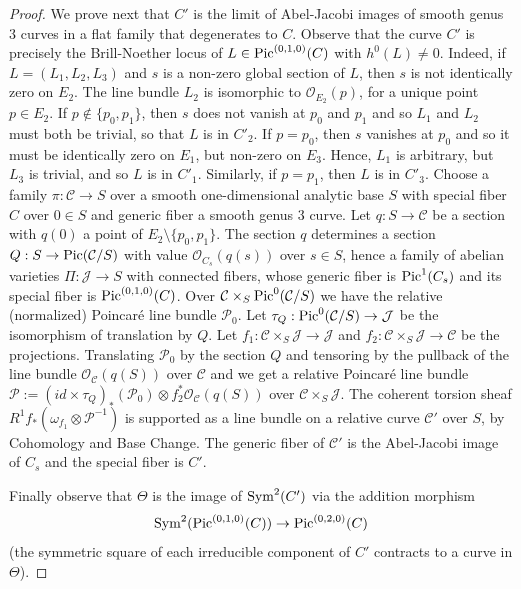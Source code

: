 \documentclass[12pt]{amsart}
\numberwithin{equation}{subsection}
\theoremstyle{plain}
\theoremstyle{definition}
\newcommand{\C}{{\mathcal C}}
\newcommand{\J}{{\mathcal J}}
\renewcommand{\P}{{\mathcal P}}
\newcommand{\StructureSheaf}[1]{{\mathcal O}_{#1}}
\newcommand{\Pic}{{\rm Pic}}
\newcommand{\Sym}{{\rm Sym}}
\begin{document}
\begin{proof}
We prove next that $C'$ is the limit of Abel-Jacobi images of smooth genus $3$ curves in a flat family that degenerates to $C$. 
Observe that the curve $C'$ is precisely the Brill-Noether locus of $L\in\Pic^{(0,1,0)}(C)$ with $h^0(L)\neq 0$. Indeed, if $L=(L_1,L_2,L_3)$ and $s$ is a non-zero global section of $L$, then $s$ is not identically zero on $E_2$. The line bundle $L_2$ is isomorphic to $\StructureSheaf{E_2}(p)$, for a unique point $p\in E_2$. If $p\not\in\{p_0,p_1\}$, then $s$ does not vanish at $p_0$ and $p_1$ and so $L_1$ and $L_2$ must both be trivial, so that $L$ is in $C'_2$. If $p=p_0$, then $s$ vanishes at $p_0$ and so it must be identically zero on $E_1$, but non-zero on $E_3$. Hence, $L_1$ is arbitrary, but $L_3$ is trivial, and so $L$ is in $C'_1$. Similarly, if $p=p_1$, then $L$ is in $C'_3$. Choose a family $\pi:\C\rightarrow S$ over a smooth one-dimensional analytic base $S$ with special fiber $C$ over $0\in S$
and generic fiber a smooth genus $3$ curve. Let $q:S\rightarrow \C$ be a section with $q(0)$ a point of $E_2\setminus\{p_0,p_1\}$. The section $q$ determines a section 
$Q:S\rightarrow \Pic(\C/S)$ with value $\StructureSheaf{C_s}(q(s))$ over $s\in S$, hence a family of abelian varieties $\Pi:\J\rightarrow S$ with connected fibers, whose generic fiber is $\Pic^1(C_s)$ and its 
special fiber is $\Pic^{(0,1,0)}(C)$. Over $\C\times_S\Pic^0(\C/S)$ we have the relative (normalized) Poincar\'{e} line bundle $\P_0$.
Let $\tau_Q: \Pic^0(\C/S)\rightarrow \J$ be the isomorphism of translation by $Q$.
Let $f_1 : \C\times_S\J\rightarrow \J$ and $f_2: \C\times_S\J\rightarrow \C$ be the projections.
Translating $\P_0$ by the section $Q$ and 
tensoring by the pullback of the line bundle $\StructureSheaf{\C}(q(S))$ over $\C$ and we get
a relative Poincar\'{e} line bundle $\P:=(id\times\tau_Q)_*(\P_0)\otimes f_2^*\StructureSheaf{\C}(q(S))$ 
over $\C\times_S\J$.  The coherent torsion sheaf $R^1f_*(\omega_{f_1}\otimes\P^{-1})$ is  supported as a line bundle on a relative curve $\C'$ over $S$, by Cohomology and Base Change. The generic fiber of $\C'$ is the Abel-Jacobi image of $C_s$ and the special fiber is $C'$.

Finally observe that $\Theta$ is the image of $\Sym^2(C')$ via the addition morphism 
\[
\Sym^2(\Pic^{(0,1,0)}(C))\rightarrow \Pic^{(0,2,0)}(C)
\] 
(the symmetric square of each irreducible component of $C'$ contracts to a curve in $\Theta$).
\end{proof}
\end{document}
